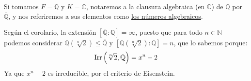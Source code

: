 \begin{ejemplo}
    Si tomamos $F = \mathbb{Q}$ y $K = \mathbb{C}$, notaremos a la clausura algebraica (en $\mathbb{C}$) de $\mathbb{Q}$ por $\overline{\mathbb{Q}}$, y nos referiremos a sus elementos como \underline{los números algebraicos}.

    \noindent
    Según el corolario, la extensión $\left[\overline{\mathbb{Q}}: \mathbb{Q}\right] = \infty$, puesto que para todo $n\in \mathbb{N}$ podemos considerar $\mathbb{Q}\left(\sqrt[n]{2}\right) \leq \overline{\mathbb{Q}}$ y $\left[\mathbb{Q}\left(\sqrt[n]{2}\right):\mathbb{Q}\right] = n$, que lo sabemos porque:
    \begin{equation*}
        \operatorname{Irr}\left(\sqrt[n]{2}, \mathbb{Q}\right) = x^n - 2
    \end{equation*}
    Ya que $x^n-2$ es irreducible, por el criterio de Eisenstein.
\end{ejemplo}

